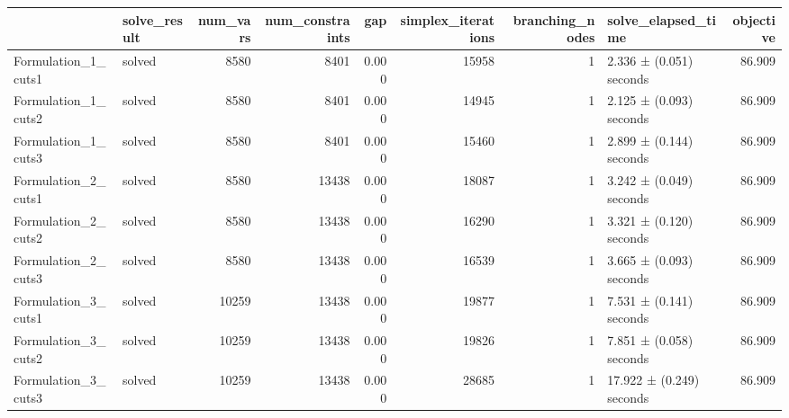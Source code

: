 \begin{tabular}{llrrrrrlr}
\toprule
 & solve_result & num_vars & num_constraints & gap & simplex_iterations & branching_nodes & solve_elapsed_time & objective \\
\midrule
Formulation_1_cuts1 & solved & 8580 & 8401 & 0.000 & 15958 & 1 & 2.336 ± (0.051) seconds & 86.909 \\
Formulation_1_cuts2 & solved & 8580 & 8401 & 0.000 & 14945 & 1 & 2.125 ± (0.093) seconds & 86.909 \\
Formulation_1_cuts3 & solved & 8580 & 8401 & 0.000 & 15460 & 1 & 2.899 ± (0.144) seconds & 86.909 \\
Formulation_2_cuts1 & solved & 8580 & 13438 & 0.000 & 18087 & 1 & 3.242 ± (0.049) seconds & 86.909 \\
Formulation_2_cuts2 & solved & 8580 & 13438 & 0.000 & 16290 & 1 & 3.321 ± (0.120) seconds & 86.909 \\
Formulation_2_cuts3 & solved & 8580 & 13438 & 0.000 & 16539 & 1 & 3.665 ± (0.093) seconds & 86.909 \\
Formulation_3_cuts1 & solved & 10259 & 13438 & 0.000 & 19877 & 1 & 7.531 ± (0.141) seconds & 86.909 \\
Formulation_3_cuts2 & solved & 10259 & 13438 & 0.000 & 19826 & 1 & 7.851 ± (0.058) seconds & 86.909 \\
Formulation_3_cuts3 & solved & 10259 & 13438 & 0.000 & 28685 & 1 & 17.922 ± (0.249) seconds & 86.909 \\
\bottomrule
\end{tabular}
